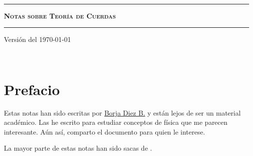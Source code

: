 \documentclass[letterpaper,11pt]{report}
\begin{document}
\sffamily

\thispagestyle{empty}
\begin{center}

\

\vspace{6.5cm}

\rule{15cm}{0.1cm}

\vspace{1.5cm}

{\huge \textsc{\textbf{Notas sobre Teoría de Cuerdas}}}

\vspace{1.5cm}

\rule{15cm}{0.1cm}

\vspace{1.5cm}

Versión del \today

\end{center}


\newpage
\thispagestyle{empty}
\ \\
\newpage
\setcounter{page}{1}

\pagestyle{plain}
\chapter*{Prefacio}
\bigskip
\bigskip
\bigskip
\bigskip
\bigskip
\bigskip
Estas notas han sido escritas por \href{https://github.com/10blackhole/}{ Borja Diez B.} y están lejos de ser un material académico. Las he escrito para estudiar conceptos de física que me parecen interesante. Aún así, comparto el documento para quien le interese. 

La mayor parte de estas notas han sido sacas de \cite{2009fcst.book.....Z}.



\bigskip
\bigskip
\bigskip
\bigskip
\bigskip
\bigskip





\bigskip
\bigskip
\bigskip

\bigskip
\bigskip
\bigskip


\tableofcontents
{}
\setcounter{page}{1}



\newpage
\printbibliography
\end{document}
